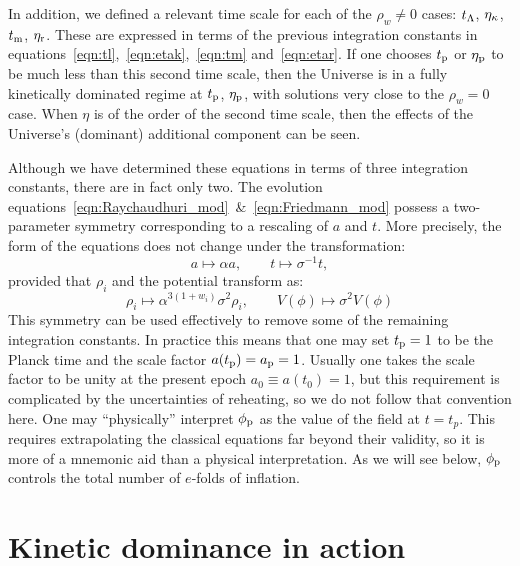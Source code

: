 In addition, we defined a relevant time scale for each of the $\rho_w \neq 0$ cases: $t_\mathrm{\Lambda}$, $\eta_\mathrm{\kappa}$, $t_{\mathrm{m}}$, $\eta_{\mathrm{r}}$. These are expressed in terms of the previous integration constants in equations~\eqref{eqn:tl},~\eqref{eqn:etak},~\eqref{eqn:tm} and~\eqref{eqn:etar}. If one chooses $t_{\mathrm{p}}$ or $\eta_{\mathrm{p}}$ to be much less than this second time scale, then the Universe is in a fully kinetically dominated regime at $t_{\mathrm{p}}$, $\eta_{\mathrm{p}}$, with solutions very close to the $\rho_w=0$ case. When $\eta$ is of the order of the second time scale, then the effects of the Universe's (dominant) additional component can be seen.

Although we have determined these equations in terms of three integration constants, there are in fact only two.  The evolution equations~\eqref{eqn:Raychaudhuri_mod}~\&~\eqref{eqn:Friedmann_mod} possess a two-parameter symmetry corresponding to a rescaling of $a$ and $t$. More precisely, the form of the equations does not change under the transformation:
%
\begin{equation}
  a\mapsto\alpha a, 
  \qquad 
  t \mapsto\sigma^{-1}t,
\end{equation}
%
provided that $\rho_i$ and the potential transform as:
%
\begin{equation}
  \rho_i \mapsto \alpha^{3(1+w_i)}\sigma^2\rho_i, 
  \qquad
  V(\phi) \mapsto \sigma^2 V(\phi)
\end{equation}
%
This symmetry can be used effectively to remove some of the remaining integration constants. In practice this means that one may set $t_{\mathrm{p}}=1$ to be the Planck time and the scale factor $a(t_{\mathrm{p}})=a_{\mathrm{p}}=1$. Usually one takes the scale factor to be unity at the present epoch $a_0\equiv a(t_0)=1$, but this requirement is complicated by the uncertainties of reheating, so we do not follow that convention here. One may ``physically'' interpret $\phi_{\mathrm{p}}$ as the value of the field at $t=t_p$.  This requires extrapolating the classical equations far beyond their validity, so it is more of a mnemonic aid than a physical interpretation.  As we will see below, $\phi_{\mathrm{p}}$ controls the total number of $e$-folds of inflation.













\section{Kinetic dominance in action}
\label{sec:Kinetic_dominance_in_action}

